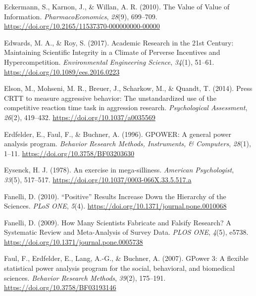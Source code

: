 \documentclass[
  oneside]{krantz}
\newlength{\cslhangindent}
\newlength{\cslentryspacingunit} %
\newenvironment{CSLReferences}[2] %
 {%
  \setlength{\parindent}{0pt}
  \ifodd #1
  \let\oldpar\par
  \def\par{\hangindent=\cslhangindent\oldpar}
  \fi
  \setlength{\parskip}{#2\cslentryspacingunit}
 }%
 {}
\begin{document}
\begin{CSLReferences}{1}{0}
\leavevmode{}%
Eckermann, S., Karnon, J., \& Willan, A. R. (2010). The {Value} of
{Value} of {Information}. \emph{PharmacoEconomics}, \emph{28}(9),
699--709. \url{https://doi.org/10.2165/11537370-000000000-00000}

\leavevmode{}%
Edwards, M. A., \& Roy, S. (2017). Academic {Research} in the 21st
{Century}: {Maintaining Scientific Integrity} in a {Climate} of
{Perverse Incentives} and {Hypercompetition}. \emph{Environmental
Engineering Science}, \emph{34}(1), 51--61.
\url{https://doi.org/10.1089/ees.2016.0223}

\leavevmode{}%
Elson, M., Mohseni, M. R., Breuer, J., Scharkow, M., \& Quandt, T.
(2014). Press {CRTT} to measure aggressive behavior: The unstandardized
use of the competitive reaction time task in aggression research.
\emph{Psychological Assessment}, \emph{26}(2), 419--432.
\url{https://doi.org/10.1037/a0035569}

\leavevmode{}%
Erdfelder, E., Faul, F., \& Buchner, A. (1996). {GPOWER}: {A} general
power analysis program. \emph{Behavior Research Methods, Instruments, \&
Computers}, \emph{28}(1), 1--11.
\url{https://doi.org/10.3758/BF03203630}

\leavevmode{}%
Eysenck, H. J. (1978). An exercise in mega-silliness. \emph{American
Psychologist}, \emph{33}(5), 517--517.
\url{https://doi.org/10.1037/0003-066X.33.5.517.a}

\leavevmode{}%
Fanelli, D. (2010). {``{Positive}''} {Results Increase Down} the
{Hierarchy} of the {Sciences}. \emph{PLoS ONE}, \emph{5}(4).
\url{https://doi.org/10.1371/journal.pone.0010068}

\leavevmode{}%
Fanelli, D. (2009). How {Many Scientists Fabricate} and {Falsify
Research}? {A Systematic Review} and {Meta-Analysis} of {Survey Data}.
\emph{PLOS ONE}, \emph{4}(5), e5738.
\url{https://doi.org/10.1371/journal.pone.0005738}

\leavevmode{}%
Faul, F., Erdfelder, E., Lang, A.-G., \& Buchner, A. (2007). {GPower} 3:
{A} flexible statistical power analysis program for the social,
behavioral, and biomedical sciences. \emph{Behavior Research Methods},
\emph{39}(2), 175--191. \url{https://doi.org/10.3758/BF03193146}


\end{CSLReferences}
\end{document}

